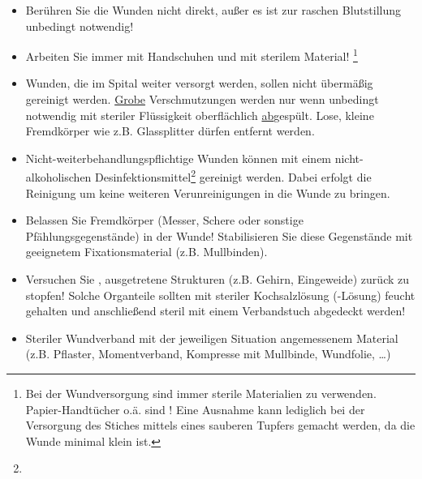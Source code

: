 {
\label{topic:wundversorgung-grundregeln}
\begin{itemize}
  \item Berühren Sie die Wunden nicht direkt, außer es ist
  zur raschen Blutstillung unbedingt notwendig!
  \item Arbeiten Sie immer mit Handschuhen und mit sterilem Material!
  \footnote{Bei der Wundversorgung sind immer sterile Materialien zu
  verwenden. Papier-Handtücher o.ä. sind ! Eine Ausnahme
  kann lediglich bei der Versorgung des Stiches mittels eines sauberen
  Tupfers gemacht werden, da die Wunde minimal klein ist.}
  
  \item Wunden, die im Spital weiter versorgt werden, sollen
  nicht übermäßig gereinigt werden. \underline{Grobe}
  Verschmutzungen werden nur wenn unbedingt notwendig mit
  steriler Flüssigkeit  oberflächlich \underline{ab}gespült. Lose, kleine
  Fremdkörper wie z.B. Glassplitter dürfen entfernt werden.
  \item Nicht-weiterbehandlungspflichtige Wunden können
  mit einem nicht-alkoholischen
  Desinfektionsmittel\footnote{} gereinigt werden. Dabei erfolgt die Reinigung
   um keine weiteren Verunreinigungen in die Wunde
  zu bringen.
  \item Belassen Sie Fremdkörper (Messer, Schere oder sonstige
  Pfählungsgegenstände)  in der Wunde! Stabilisieren Sie diese Gegenstände mit 
  geeignetem Fixationsmaterial (z.B. Mullbinden).
  \item Versuchen Sie , ausgetretene Strukturen
  (z.B. Gehirn, Eingeweide) zurück zu stopfen! Solche Organteile sollten mit
  steriler Kochsalzlösung (-Lösung) feucht gehalten und anschließend
  steril  mit einem Verbandstuch abgedeckt werden!
  \item Steriler Wundverband mit der jeweiligen Situation
  angemessenem Material (z.B. Pflaster, Momentverband,
  Kompresse mit Mullbinde, Wundfolie, \ldots)
\end{itemize}
}{}{}{}{}


